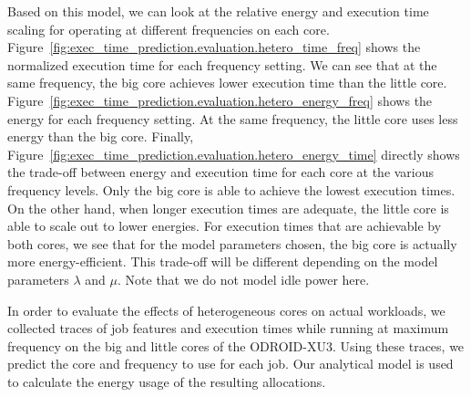 Based on this model, we can look at the relative energy and execution time
scaling for operating at different frequencies on each core.
Figure~\ref{fig:exec_time_prediction.evaluation.hetero_time_freq} shows the
normalized execution time for each frequency setting. We can see that at the
same frequency, the big core achieves lower execution time than the little
core. Figure~\ref{fig:exec_time_prediction.evaluation.hetero_energy_freq} shows
the energy for each frequency setting. At the same frequency, the little core
uses less energy than the big core. Finally,
Figure~\ref{fig:exec_time_prediction.evaluation.hetero_energy_time} directly
shows the trade-off between energy and execution time for each core at the
various frequency levels. Only the big core is able to achieve the lowest execution
times. On the other hand, when longer execution times are adequate, the little
core is able to scale out to lower energies. For execution times that are
achievable by both cores, we see that for the model parameters chosen,
the big core is actually more energy-efficient. This trade-off will be
different depending on the model parameters $\lambda$ and $\mu$. Note that we
do not model idle power here.

In order to evaluate the effects of heterogeneous cores on actual workloads, we
collected traces of job features and execution times while running at maximum
frequency on the big and little cores of the ODROID-XU3. Using these traces, we
predict the core and frequency to use for each job. Our analytical model is
used to calculate the energy usage of the resulting allocations.

